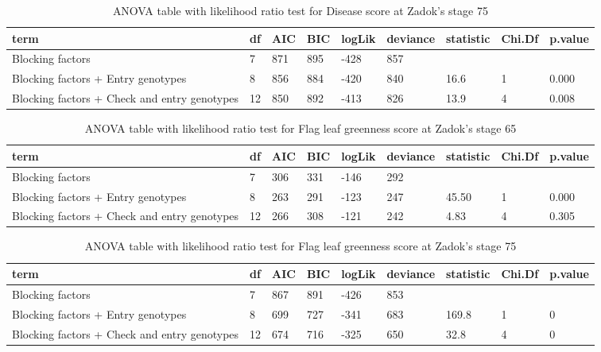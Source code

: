 \documentclass[12pt,oneside]{dukestatscithesis} %
\theoremstyle{definition}
\theoremstyle{definition}
\theoremstyle{definition}
\theoremstyle{remark}
\begin{document}
\begin{table}[H]

\caption{\label{tab:unnamed-chunk-4}\label{tab:lrt-dis-score}ANOVA table with likelihood ratio test for Disease score at Zadok's stage 75}
\centering
\begin{tabular}[t]{>{\raggedright\arraybackslash}p{3.5cm}llllllll}
\toprule
term & df & AIC & BIC & logLik & deviance & statistic & Chi.Df & p.value\\
\midrule
Blocking factors & 7 & 871 & 895 & -428 & 857 &  &  & \\
Blocking factors + Entry genotypes & 8 & 856 & 884 & -420 & 840 & 16.6 & 1 & 0.000\\
Blocking factors + Check and entry genotypes & 12 & 850 & 892 & -413 & 826 & 13.9 & 4 & 0.008\\
\bottomrule
\end{tabular}
\end{table}\begin{table}[H]
\caption{\label{tab:unnamed-chunk-4}\label{tab:lrt-greenness1}ANOVA table with likelihood ratio test for Flag leaf greenness score at Zadok's stage 65}
\centering
\begin{tabular}[t]{>{\raggedright\arraybackslash}p{3.5cm}llllllll}
\toprule
term & df & AIC & BIC & logLik & deviance & statistic & Chi.Df & p.value\\
\midrule
Blocking factors & 7 & 306 & 331 & -146 & 292 &  &  & \\
Blocking factors + Entry genotypes & 8 & 263 & 291 & -123 & 247 & 45.50 & 1 & 0.000\\
Blocking factors + Check and entry genotypes & 12 & 266 & 308 & -121 & 242 & 4.83 & 4 & 0.305\\
\bottomrule
\end{tabular}
\end{table}\begin{table}[H]
\caption{\label{tab:unnamed-chunk-4}\label{tab:lrt-greenness2}ANOVA table with likelihood ratio test for Flag leaf greenness score at Zadok's stage 75}
\centering
\begin{tabular}[t]{>{\raggedright\arraybackslash}p{3.5cm}llllllll}
\toprule
term & df & AIC & BIC & logLik & deviance & statistic & Chi.Df & p.value\\
\midrule
Blocking factors & 7 & 867 & 891 & -426 & 853 &  &  & \\
Blocking factors + Entry genotypes & 8 & 699 & 727 & -341 & 683 & 169.8 & 1 & 0\\
Blocking factors + Check and entry genotypes & 12 & 674 & 716 & -325 & 650 & 32.8 & 4 & 0\\

\end{tabular}
\end{table}
\end{document}
